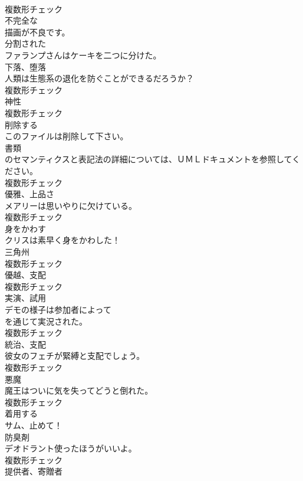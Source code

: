 \documentclass[8pt]{extreport}
\begin{document}
\begin{CJK}{UTF8}{min}
\\	複数形チェック
\\	[形容詞]	不完全な	
\\	描画が不良です。	
\\	[形容詞]	分割された	
\\	ファランプさんはケーキを二つに分けた。	
\\	[名詞]	下落、堕落	
\\	人類は生態系の退化を防ぐことができるだろうか？	
\\	複数形チェック
\\	[名詞]	神性	
\\	複数形チェック
\\	[動詞]	削除する	
\\	このファイルは削除して下さい。	
\\	[名詞]	書類	
\\	のセマンティクスと表記法の詳細については、ＵＭＬドキュメントを参照してください。	
\\	複数形チェック
\\	[名詞]	優雅、上品さ	
\\	メアリーは思いやりに欠けている。	
\\	複数形チェック
\\	[動詞]	身をかわす	
\\	クリスは素早く身をかわした！	
\\	[名詞]	三角州	
\\	複数形チェック
\\	[名詞]	優越、支配	
\\	複数形チェック
\\	[名詞]	実演、試用	
\\	デモの様子は参加者によって
\\	を通じて実況された。	
\\	複数形チェック
\\	[名詞]	統治、支配	
\\	彼女のフェチが緊縛と支配でしょう。	
\\	複数形チェック
\\	[名詞]	悪魔	
\\	魔王はついに気を失ってどうと倒れた。	
\\	複数形チェック
\\	[動詞]	着用する	
\\	サム、止めて！	
\\	[名詞]	防臭剤	
\\	デオドラント使ったほうがいいよ。	
\\	複数形チェック
\\	[名詞]	提供者、寄贈者	

\end{CJK}
\end{document}
